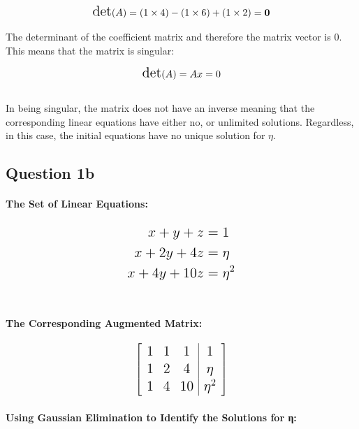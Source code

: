 \documentclass[
]{article}
\begin{document}
\[
\Large
\text{det}(A)=
(1 \times 4)  - (1 \times 6) + (1 \times 2) = \mathbf{0}
\]

The determinant of the coefficient matrix and therefore the matrix
vector is \(0\). This means that the matrix is singular:

\[
\Large
\text{det}(A) = Ax = 0
\]\\

In being singular, the matrix does not have an inverse meaning that the
corresponding linear equations have either no, or unlimited solutions.
Regardless, in this case, the initial equations have no unique solution
for \(η\).

\hfill\break
\hfill\break
\hfill\break
\hfill\break

\subsection{Question 1b}\label{question-1b}

\paragraph{The Set of Linear
Equations:}\label{the-set-of-linear-equations}

\[
\Large
\begin{aligned}
x + y + z &= 1 \\
x + 2y + 4z &= \eta \\
x + 4y + 10z &= \eta^2
\end{aligned}
\]\\

\paragraph{The Corresponding Augmented
Matrix:}\label{the-corresponding-augmented-matrix}

\[
\Large
\left[
\begin{array}{ccc|c}
1 & 1 & 1 & 1 \\
1 & 2 & 4 & \eta \\
1 & 4 & 10 & \eta^2
\end{array}
\right]
\]

\paragraph{Using Gaussian Elimination to Identify the Solutions for
η:}\label{using-gaussian-elimination-to-identify-the-solutions-for-ux3b7}
\end{document}
